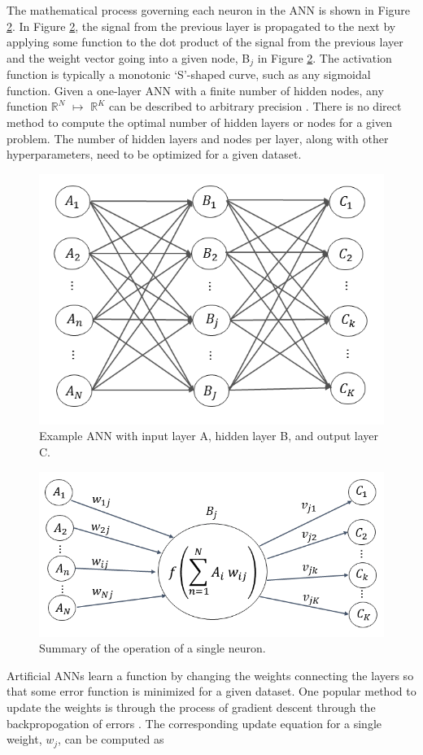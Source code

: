 \documentclass[tocnosub,noragright,centerchapter,12pt,fullpage]{uiucecethesis09}
\begin{document}
The mathematical process governing each neuron in the ANN is shown in Figure \ref{fig:Node}. In Figure \ref{fig:Node}, the signal from the previous layer is propagated to the next by applying some function to the dot product of the signal from the previous layer and the weight vector going into a given node, B$_{j}$ in Figure \ref{fig:Node}. The activation function is typically a monotonic `S'-shaped curve, such as any sigmoidal function. Given a one-layer ANN with a finite number of hidden nodes, any function $\mathbb{R}^N$ $\mapsto$ $\mathbb{R}^K$ can be described to arbitrary precision \cite{hornik1991}. There is no direct method to compute the optimal number of hidden layers or nodes for a given problem. The number of hidden layers and nodes per layer, along with other hyperparameters, need to be optimized for a given dataset.

\begin{figure}[H]
    \centering
    \includegraphics[width=0.5\linewidth]{images/Network}
    \caption{Example ANN with input layer A, hidden layer B, and output layer C.}
    \label{fig:Network}
\end{figure}

\begin{figure}[H]
	\centering
	\includegraphics[width=0.55\linewidth]{images/Node_ABC_2}
	\caption{Summary of the operation of a single neuron.}
	\label{fig:Node}
\end{figure}

Artificial ANNs learn a function by changing the weights connecting the layers so that some error function is minimized for a given dataset. One popular method to update the weights is through the process of gradient descent through the backpropogation of errors \cite{Rumelhart1986}. The corresponding update equation for a single weight, $w_j$, can be computed as 
\end{document}
